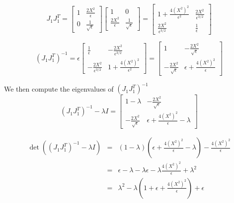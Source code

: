 \documentclass[12pt]{article}
\begin{document}
\begin{equation}
J_1 J_1^T =
\begin{bmatrix} 1 & \frac{2X^2}{\epsilon} \\ 0 & \frac{1}{\sqrt{\epsilon}} \end{bmatrix} 
\begin{bmatrix} 1 & 0 \\ \frac{2X^2}{\epsilon} & \frac{1}{\sqrt{\epsilon}} \end{bmatrix}
= \begin{bmatrix}
1+\frac{4 \left( X^2 \right)^2}{\epsilon^2} & \frac{2X^2}{\epsilon^{3/2}} \\
\frac{2X^2}{\epsilon^{3/2}} & \frac{1}{\epsilon}
\end{bmatrix}
\end{equation}

\begin{equation}
\left( J_1 J_1^T \right)^{-1} = 
\epsilon \begin{bmatrix}
\frac{1}{\epsilon} & -\frac{2X^2}{\epsilon^{3/2}} \\
-\frac{2X^2}{\epsilon^{3/2}} & 1+\frac{4 \left( X^2 \right)^2}{\epsilon^2}
\end{bmatrix}
= \begin{bmatrix}
1 & -\frac{2X^2}{\sqrt{\epsilon}} \\
-\frac{2X^2}{\sqrt{\epsilon}} & \epsilon+\frac{4 \left( X^2 \right)^2}{\epsilon}
\end{bmatrix}
\end{equation}

We then compute the eigenvalues of $(J_1 J_1^T)^{-1}$
\begin{equation}
\left( J_1 J_1^T \right)^{-1} - \lambda I =
\begin{bmatrix}
1-\lambda & -\frac{2X^2}{\sqrt{\epsilon}} \\
-\frac{2X^2}{\sqrt{\epsilon}} & \epsilon+\frac{4 \left( X^2 \right)^2}{\epsilon}-\lambda
\end{bmatrix}
\end{equation}

\begin{eqnarray}
\det \left( \left( J_1 J_1^T \right)^{-1} - \lambda I \right) &=& 
\left(1-\lambda \right) \left( \epsilon+\frac{4 \left( X^2 \right)^2}{\epsilon}-\lambda \right) - \frac{4 (X^2)^2 }{\epsilon} \\
&=& \epsilon - \lambda  - \lambda \epsilon - \lambda \frac{4 \left( X^2 \right)^2}{\epsilon} + \lambda^2 \\
&=& \lambda^2 - \lambda \left( 1 + \epsilon + \frac{4 \left( X^2 \right)^2}{\epsilon} \right) + \epsilon
\end{eqnarray}
\end{document}
